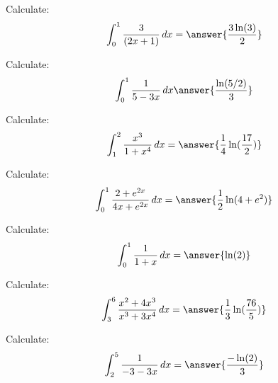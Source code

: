 \documentclass{ximera}
\begin{document}
\begin{exercise}
\begin{problem} Calculate:
\[
\int_0^1 \frac{3}{(2x+1)} \d x = \answer{\frac{3 \ln (3)}{2}}
\]
\end{problem}


\begin{problem} Calculate:
\[
\int_0^1 \frac{1}{5-3x} \d x \answer{\frac{\ln(5/2)}{3}}
\]
\end{problem}

\begin{problem} Calculate:
\[
\int_1^2 \frac{x^3}{1 + x^4} \d x = \answer{\frac{1}{4} \ln(\frac{17}{2})}
\]
\end{problem}



\begin{problem} Calculate:
\[
\int_0^1 \frac{2+ e^{2x}}{4x + e^{2x}} \d x = \answer{\frac{1}{2} \ln(4+e^2)}
\]
\end{problem}



\begin{problem} Calculate:
\[
\int_0^1 \frac{1}{1 + x} \d x =\answer{\ln(2)}
\]
\end{problem}


\begin{problem} Calculate:
\[
\int_3^6 \frac{x^2+4x^3}{x^3+3x^4} \d x =\answer{\frac{1}{3} \ln(\frac{76}{5})}
\]
\end{problem}



\begin{problem} Calculate:
\[
\int_2^5 \frac{1}{-3-3x} \d x =\answer{\frac{-\ln(2)}{3}}
\]
\end{problem}

\end{exercise}
\end{document}
